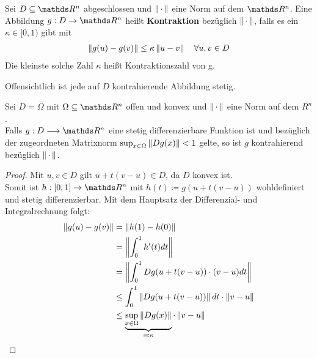 \begin{Defe}
	Sei $D\subseteq  \R^n $ abgeschlossen und $\left\| \,\cdot\, \right\|$ eine Norm auf dem $\R^n$.
	Eine Abbildung $g:D\rightarrow \R^n $ heißt \textbf{Kontraktion} bezüglich  $\left\| \,\cdot\, \right\|$,
	falls es ein $\kappa \in [0,1)$ gibt mit
	\begin{gather*}
	\left\| g(u)-g(v) \right\| \leq \kappa \left\| u-v \right\| \quad \forall u,v\in D
	\end{gather*}
	Die kleinste solche Zahl $\kappa$ heißt Kontraktionszahl von g.
	
	
	Offensichtlich ist jede auf $D$ kontrahierende Abbildung stetig.
\end{Defe}  

\begin{Leme}
	\label{5.2.3}
	Sei $D=\overline{\Omega} $ mit $\Omega \subseteq \R^n$ offen und konvex
	und $\left\| \,\cdot\, \right\|$ eine Norm auf dem $R^n$.\\
	Falls $g:D\longrightarrow \R^n$ eine stetig differenzierbare Funktion ist und
	bezüglich der zugeordneten Matrixnorm $\sup_{x\in \Omega}\left\| Dg(x) \right\|<1$ gelte,
	so ist $g$ kontrahierend bezüglich  $\left\| \,\cdot\, \right\|$.
\end{Leme} 

\begin{proof}
	Mit $u,v \in D$ gilt $u+t(v-u)\in D$, da $D$ konvex ist. \\
	Somit ist $h:[0,1]\rightarrow \R^n $ mit $h(t) \coloneqq g(u+t(v-u))$ wohldefiniert
	und stetig differenzierbar. Mit dem Hauptsatz der Differenzial- und Integralrechnung
	folgt:
	\begin{align}\nonumber
	\left\| g(u)-g(v) \right\| & = \left\| h(1)-h(0) \right\|  \\ \nonumber
	& = \left\| \int_{0}^{1} h'(t) dt \right\| \\ \nonumber
	& = \left\| \int_{0}^{1} Dg(u+t(v-u))\cdot (v-u)dt \right\| \\ \nonumber
	& \leq \int_{0}^{1} \left\| Dg(u+t(v-u)) \right\|dt \cdot \left\| v-u \right\| \\
	& \leq \underbrace{\sup_{x\in\Omega}\left\| Dg(x) \right\|}_{\eqqcolon \kappa} 
	\cdot \left\| v-u \right\|
	\label{V.2.4}
	\end{align}
\end{proof}


